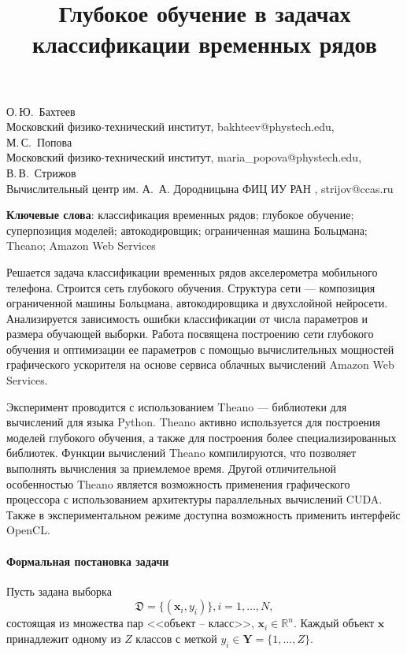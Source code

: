 \documentclass[12pt]{article}
\begin{document}
\title{Глубокое обучение в задачах классификации временных рядов%
}
\date{}
\maketitle

 \begin{center}
 {О.\,Ю.~Бахтеев \\ {Московский физико-технический институт, bakhteev@phystech.edu},
 \\ М.\,С.~Попова \\ {Московский физико-технический институт, maria\_popova@phystech.edu},
 \\ В.\,В.~Стрижов \\ {Вычислительный центр им. А.~А. Дородницына
 ФИЦ ИУ РАН%
, strijov@ccas.ru}} %
 \end{center}


\bigskip
\textbf{Ключевые слова}:  классификация временных рядов; глубокое обучение; суперпозиция моделей; автокодировщик; ограниченная машина Больцмана; Theano; Amazon Web Services

Решается задача классификации временных рядов акселерометра мобильного телефона. Строится сеть глубокого обучения. Структура сети --- композиция ограниченной машины Больцмана, автокодировщика и двухслойной нейросети. Анализируется зависимость ошибки классификации от числа параметров и размера обучающей выборки.  Работа посвящена построению сети глубокого обучения и оптимизации ее параметров с помощью вычислительных мощностей графического ускорителя на основе сервиса облачных вычислений Amazon Web Services.  

Эксперимент проводится с использованием Theano --- библиотеки для вычислений для языка Python. Theano активно используется для построения моделей глубокого обучения, а также для построения более специализированных библиотек. Функции вычислений Theano компилируются, что позволяет выполнять вычисления за приемлемое время. Другой отличительной особенностью Theano является возможность применения графического процессора с использованием архитектуры параллельных вычислений CUDA. Также в экспериментальном режиме доступна возможность применить интерфейс OpenCL.

\paragraph{Формальная постановка задачи}
Пусть задана выборка \begin{equation}\label{eq:dataset}\mathfrak{D} = \{(\mathbf{x}_i,y_i)\}, i = 1,\dots,N,\end{equation} состоящая из множества пар <<объект -- класс>>, $\mathbf{x}_i \in \mathbb{R}^n$. Каждый объект $\mathbf{x}$ принадлежит одному из $Z$ классов с меткой $y_i \in \mathbf{Y} = \{1,\dots,Z\}$.
\end{document}
